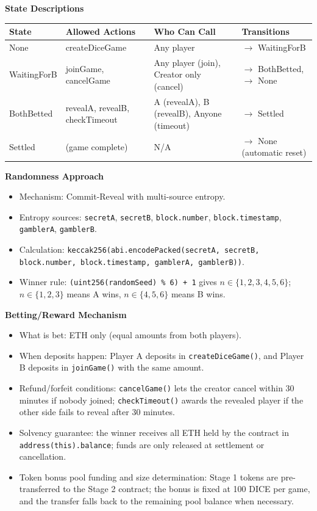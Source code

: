 \documentclass[10pt,a4paper]{article}
\begin{document}
\noindent\textbf{State Descriptions}

\smallskip
\noindent\begin{tabularx}{\textwidth}{@{}>{\raggedright\arraybackslash}p{}>{\raggedright\arraybackslash}p{}>{\raggedright\arraybackslash}p{}X@{}}
\toprule
\textbf{State} & \textbf{Allowed Actions} & \textbf{Who Can Call} & \textbf{Transitions} \\
\midrule
None & createDiceGame & Any player & $\rightarrow$ WaitingForB \\
WaitingForB & joinGame, cancelGame & Any player (join), Creator only (cancel) & $\rightarrow$ BothBetted, $\rightarrow$ None \\
BothBetted & revealA, revealB, checkTimeout & A (revealA), B (revealB), Anyone (timeout) & $\rightarrow$ Settled \\
Settled & (game complete) & N/A & $\rightarrow$ None (automatic reset) \\
\bottomrule
\end{tabularx}

\medskip
\noindent\textbf{Randomness Approach}
\begin{itemize}
  \item Mechanism: Commit-Reveal with multi-source entropy.
  \item Entropy sources: \texttt{secretA}, \texttt{secretB}, \texttt{block.number}, \texttt{block.timestamp}, \texttt{gamblerA}, \texttt{gamblerB}.
  \item Calculation: \texttt{keccak256(abi.encodePacked(secretA, secretB, block.number, block.timestamp, gamblerA, gamblerB))}.
  \item Winner rule: \texttt{(uint256(randomSeed) \% 6) + 1} gives \(n \in \{1,2,3,4,5,6\}\); \(n \in \{1,2,3\}\) means A wins, \(n \in \{4,5,6\}\) means B wins.
\end{itemize}

\noindent\textbf{Betting/Reward Mechanism}
\begin{itemize}
  \item What is bet: ETH only (equal amounts from both players).
  \item When deposits happen: Player A deposits in \texttt{createDiceGame()}, and Player B deposits in \texttt{joinGame()} with the same amount.
  \item Refund/forfeit conditions: \texttt{cancelGame()} lets the creator cancel within 30 minutes if nobody joined; \texttt{checkTimeout()} awards the revealed player if the other side fails to reveal after 30 minutes.
  \item Solvency guarantee: the winner receives all ETH held by the contract in \texttt{address(this).balance}; funds are only released at settlement or cancellation.
  \item Token bonus pool funding and size determination: Stage 1 tokens are pre-transferred to the Stage 2 contract; the bonus is fixed at 100 DICE per game, and the transfer falls back to the remaining pool balance when necessary.
\end{itemize}
\end{document}

